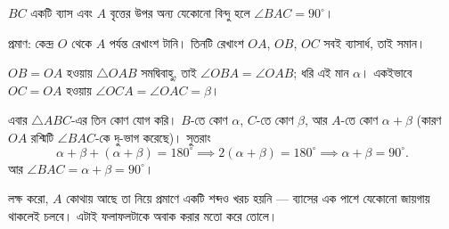 \documentclass[11pt]{article}
\begin{document}
\begin{idea}[অর্ধবৃত্তস্থ কোণ এক সমকোণ]
$BC$ একটি ব্যাস এবং $A$ বৃত্তের উপর অন্য যেকোনো বিন্দু হলে $\angle BAC = 90^\circ$।

\begin{center}
\end{center}

\noindent
প্রমাণ: কেন্দ্র $O$ থেকে $A$ পর্যন্ত রেখাংশ টানি। তিনটি রেখাংশ $OA$, $OB$, $OC$
সবই ব্যাসার্ধ, তাই সমান।

$OB = OA$ হওয়ায় $\triangle OAB$ সমদ্বিবাহু, তাই $\angle OBA = \angle OAB$;
ধরি এই মান $\alpha$। একইভাবে $OC = OA$ হওয়ায় $\angle OCA = \angle OAC = \beta$।

এবার $\triangle ABC$-এর তিন কোণ যোগ করি। $B$-তে কোণ $\alpha$, $C$-তে কোণ
$\beta$, আর $A$-তে কোণ $\alpha + \beta$ (কারণ $OA$ রশ্মিটি $\angle BAC$-কে
দু-ভাগ করেছে)। সুতরাং
\[
  \alpha + \beta + (\alpha + \beta) = 180^\circ \implies
  2(\alpha + \beta) = 180^\circ \implies \alpha + \beta = 90^\circ .
\]
আর $\angle BAC = \alpha + \beta = 90^\circ$।

লক্ষ করো, $A$ কোথায় আছে তা নিয়ে প্রমাণে একটি শব্দও খরচ হয়নি --- ব্যাসের এক পাশে
যেকোনো জায়গায় থাকলেই চলবে। এটাই ফলাফলটাকে অবাক করার মতো করে তোলে।
\end{idea}
\end{document}

